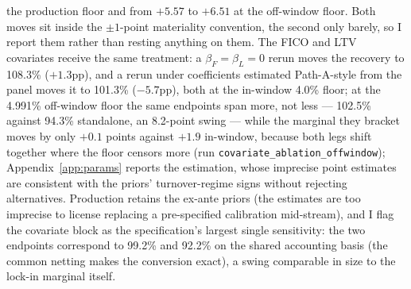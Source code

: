 \documentclass[12pt]{article}
\begin{document}
the production floor and from $+5.57$ to $+6.51$ at the off-window floor. Both moves sit inside the $\pm 1$-point materiality convention, the second only barely, so I report them rather than resting anything on them. The FICO and LTV covariates receive the same treatment: a $\beta_F = \beta_L = 0$ rerun moves the recovery to 108.3\% ($+1.3$pp), and a rerun under coefficients estimated Path-A-style from the panel moves it to 101.3\% ($-5.7$pp), both at the in-window 4.0\% floor; at the 4.991\% off-window floor the same endpoints span more, not less --- 102.5\% against 94.3\% standalone, an 8.2-point swing --- while the marginal they bracket moves by only $+0.1$ points against $+1.9$ in-window, because both legs shift together where the floor censors more (run \texttt{covariate\_ablation\_offwindow}); Appendix~\ref{app:params} reports the estimation, whose imprecise point estimates are consistent with the priors' turnover-regime signs without rejecting alternatives. Production retains the ex-ante priors (the estimates are too imprecise to license replacing a pre-specified calibration mid-stream), and I flag the covariate block as the specification's largest single sensitivity: the two endpoints correspond to 99.2\% and 92.2\% on the shared accounting basis (the common netting makes the conversion exact), a swing comparable in size to the lock-in marginal itself.
\end{document}
